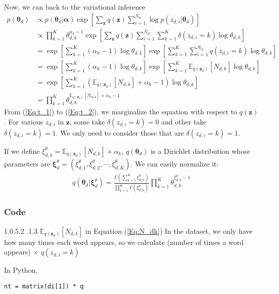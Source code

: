 \documentclass[a4paper,10.5pt,dvipdfmx]{jarticle}  %
\makeatletter
\newcommand{\subsubsubsection}{\@startsection{paragraph}{4}{\z@}%
    {1.0\Cvs \@plus.5\Cdp \@minus.2\Cdp}%
    {.1\Cvs \@plus.3\Cdp}%
    {\reset@font\normalsize}
  }
\makeatother
\begin{document}
Now, we can back to the variational inference
\begin{align}
	p(\boldsymbol{\theta}_d) &\propto p(\boldsymbol{\theta}_d | \boldsymbol{\alpha}) \exp \left[ \sum_{\boldsymbol{z}} q(\boldsymbol{z}) \sum_{i=1}^{N_d} \log p(z_{d,i} | \boldsymbol{\theta}_d) \right]\\
 &\propto \prod_{k=1}^{K} \theta_{d,k}^{\alpha_k -1} \exp \left[ \sum_{\boldsymbol{z}} q(\boldsymbol{z}) \sum_{i=1}^{N_d} \sum_{k=1}^{K} \delta({z_{d,i} = k}) \log \theta_{d,k} \right] \label{Eq:t_1} \\
&= \exp \left[ \sum_{k=1}^{K} (\alpha_k -1) \log \theta_{d,k} \right] \exp \left[ \sum_{k=1}^{K} \sum_{i=1}^{N_d} q(z_{d,i} = k) \log \theta_{d,k} \right] \label{Eq:t_2} \\
&= \exp \left[\sum_{k=1}^{K} (\alpha_k -1) \log \theta_{d,k}  \right] \exp \left[ \sum_{k=1}^{K} \mathbb{E}_{q(\boldsymbol{z}_d)}[N_{d,k}]  \log \theta_{d,k} \right] \\
&= \exp \left[ \sum_{k=1}^{K} (\mathbb{E}_{q(\boldsymbol{z}_d)}[N_{d,k}] + \alpha_k -1) \log \theta_{d,k} \right]\\
&= \prod_{k=1}^{K} \theta_{d,k}^{\mathbb{E}_{q(\boldsymbol{z}_d)}[N_{d,k}] + \alpha_k -1}
\end{align}
From (\ref{Eq:t_1}) to (\ref{Eq:t_2}), we marginalize the equation with respect to $q(\boldsymbol{z})$. For various $z_{d,i}$ in $\boldsymbol{z}$, some take $\delta({z_{d,i} = k})=0$ and other take $\delta({z_{d,i} = k})=1$. We only need to consider those that are $\delta({z_{d,i} = k})=1$. \par
If we define $\xi_{d,k}^{\theta} = \mathbb{E}_{q(\boldsymbol{z}_d)}[N_{d,k}] + \alpha_k$, $q(\boldsymbol{\theta}_d)$ is a Dirichlet distribution whose parameters are $\boldsymbol{\xi}_{d}^{\theta} = (\xi_{d,1}^{\theta}, \xi_{d,2}^{\theta}, \cdots, \xi_{d,K}^{\theta})$. We can easily normalize it:
\begin{align}
	q(\boldsymbol{\theta}_d | \boldsymbol{\xi}_{d}^{\theta}) = \frac{\Gamma (\sum_{k=1}^{K} \xi_{d,k}^{\theta})}{\prod_{k=1}^{K} \Gamma(\xi_{d,k}^{\theta})} \prod_{k=1}^{K} \theta_{d,k}^{\xi_{d,k}^{\theta} -1}
\end{align}


\subsubsection{Code}
\subsubsubsection{$\mathbb{E}_{q(\boldsymbol{z}_d)}[N_{d,k}]$ in Equation (\ref{Eq:N_dk})}
In the dataset, we only have how many times each word appears, so we calculate (number of times a word appears) $\times$ $q(z_{d,i}=k)$\par
In Python,
\begin{lstlisting}[style=Python]
nt = matrix(di[1]) * q
\end{lstlisting}
\end{document}
